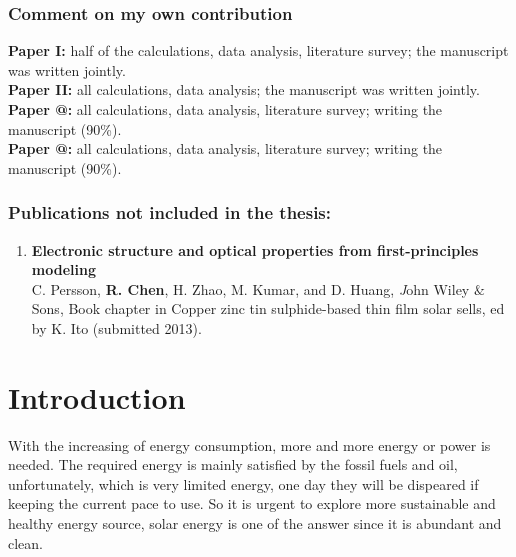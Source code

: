 \documentclass[a4paper, 12pt, titlepage,oneside,drop]{kthesis}
\makeatletter
\newcommand{\Rmnum}[1]{\expandafter\@slowromancap\romannumeral #1@}
\makeatother
\begin{document}
\subsection*{Comment on my own contribution}

\textbf{Paper I:} half of the calculations, data analysis, literature survey;
the manuscript was written jointly.\\
\textbf{Paper II:} all calculations, data analysis; the manuscript was
written jointly.\\
\textbf{Paper \Rmnum{3}:} all calculations, data analysis, literature survey;
writing the manuscript (90\%).\\
\textbf{Paper \Rmnum{4}:} all calculations, data analysis, literature survey;
writing the manuscript (90\%).\\

\subsection*{Publications not included in the thesis:}
\begin{enumerate}
\renewcommand{\labelenumi}{\Roman{enumi}}
\setcounter{enumi}{4}

\item{}\textbf{Electronic structure and optical properties from first-principles modeling}
\\C. Persson, \textbf{R. Chen}, H. Zhao, M. Kumar, and D. Huang, {\textit John Wiley $\&$ Sons}, {Book chapter in Copper zinc tin sulphide-based thin film solar sells, ed by K. Ito} (submitted 2013).


\end{enumerate}

\newpage
\setcounter{page}{7}
\setcounter{secnumdepth}{3}
\setcounter{tocdepth}{3}
\tableofcontents







\newpage
{}

\chapter{Introduction }
With the increasing of energy consumption, more and more energy or power is needed. The required energy is mainly satisfied by the fossil fuels and oil, unfortunately,
which is very limited energy, one day they will be dispeared if keeping the current pace to use. So it is urgent to explore more sustainable and healthy energy source,
solar energy is one of the answer since it is abundant and clean. 
\end{document}
